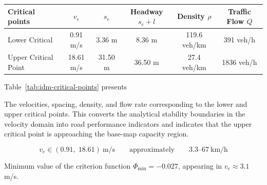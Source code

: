 \documentclass[11pt,a4paper,openany]{book}
\numberwithin{equation}{chapter}
\numberwithin{figure}{chapter}
\numberwithin{table}{chapter}
\newcommand{\tabletext}[2]{%
  \par\smallskip\noindent
  Table~\ref{#1} presents #2
\par\smallskip
}
\begin{document}
\begin{center}
\label{tab:idm-critical-points}
\begin{tabular}{lccccc}
\toprule







Critical points




& $v_e$ & $s_e$ &




 Headway $s_e+l$




&




 Density $\rho$




&




Traffic Flow $Q$



\\
\midrule







Lower Critical




& 0.91 m/s & 3.36 m & 8.36 m & 119.6 veh/km & 391 veh/h \\







Upper Critical Point




& 18.61 m/s & 31.50 m & 36.50 m & 27.4 veh/km & 1836 veh/h \\
\bottomrule
\end{tabular}
\end{center}
\tabletext{tab:idm-critical-points}{




The velocities, spacing, density, and flow rate corresponding to the lower and upper critical points. This converts the analytical stability boundaries in the velocity domain into road performance indicators and indicates that the upper critical point is approaching the base-map capacity region.
}

\begin{tcolorbox}[notebox,title=\textbf{Linear Instability Interval}]

\[
v_e \in (0.91,\; 18.61)\ \text{m/s}
\qquad\text{approximately}\qquad
3.3\text{--}67\ \text{km/h}
\]

Minimum value of the criterion function $\Phi_{\min}=-0.027$, appearing in $v_e\approx 3.1$ m/s.







\end{tcolorbox}
\end{document}
